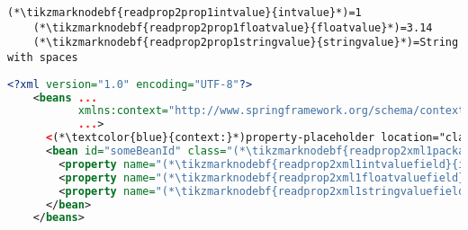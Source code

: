 \newpage

\enlargethispage{20mm}
\thispagestyle{empty}
\begin{lstlisting}[title={A \mboxtextit{.properties} file called \tikzmarknodebf{readprop2prop1filename}{\textit{setters.properties}}}]
    (*\tikzmarknodebf{readprop2prop1intvalue}{intvalue}*)=1
    (*\tikzmarknodebf{readprop2prop1floatvalue}{floatvalue}*)=3.14
    (*\tikzmarknodebf{readprop2prop1stringvalue}{stringvalue}*)=String with spaces
\end{lstlisting}
\begin{lstlisting}[language=XML, title={Configuration XML}]
    <?xml version="1.0" encoding="UTF-8"?>
    <beans ...
           xmlns:context="http://www.springframework.org/schema/context"
           ...>
      <(*\textcolor{blue}{context:}*)property-placeholder location="classpath:(*\tikzmarknodebf{readprop2xml1filename}{setter.properties}[ForestGreen]*)" file-encoding="utf-8"/>
      <bean id="someBeanId" class="(*\tikzmarknodebf{readprop2xml1package}{somepackage.subpackage}[ForestGreen]*).(*\tikzmarknodebf{readprop2xml1class}{WantedClass}[ForestGreen]*)">
        <property name="(*\tikzmarknodebf{readprop2xml1intvaluefield}{intValueField}[ForestGreen]*)" value="(*\textcolor{ForestGreen}{\$\{}\tikzmarknodebf{readprop2xml1intvalue}{intvalue}[ForestGreen]\textcolor{ForestGreen}{\}}*)"/>
        <property name="(*\tikzmarknodebf{readprop2xml1floatvaluefield}{floatValueField}[ForestGreen]*)" value="(*\textcolor{ForestGreen}{\$\{}\tikzmarknodebf{readprop2xml1floatvalue}{floatvalue}[ForestGreen]\textcolor{ForestGreen}{\}}*)"/>
        <property name="(*\tikzmarknodebf{readprop2xml1stringvaluefield}{stringValueField}[ForestGreen]*)" value="(*\textcolor{ForestGreen}{\$\{}\tikzmarknodebf{readprop2xml1stringvalue}{stringvalue}[ForestGreen]\textcolor{ForestGreen}{\}}*)"/>
      </bean>
    </beans>
\end{lstlisting}
